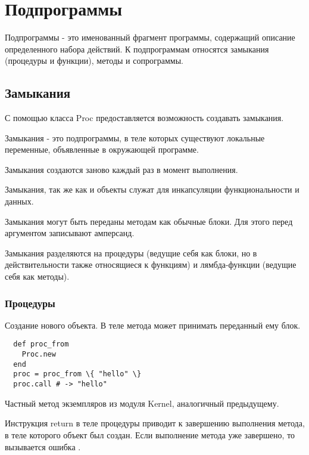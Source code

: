 \chapter{Подпрограммы}

Подпрограммы - это именованный фрагмент программы, содержащий описание определенного набора действий. К подпрограммам относятся замыкания (процедуры и функции), методы и сопрограммы.

\section{Замыкания}

С помощью класса Proc предоставляется возможность создавать замыкания. 

Замыкания - это подпрограммы, в теле которых существуют локальные переменные, объявленные в окружающей программе.

Замыкания создаются заново каждый раз в момент выполнения.

Замыкания, так же как и объекты служат для инкапсуляции функциональности и данных.

Замыкания могут быть переданы методам как обычные блоки. Для этого перед аргументом записывают амперсанд.

Замыкания разделяются на процедуры (ведущие себя как блоки, но в действительности также относящиеся к функциям) и лямбда-функции (ведущие себя как методы).

\subsection{Процедуры}

\begin{methodlist}
  Создание нового объекта. В теле метода может принимать переданный ему блок.
  \begin{verbatim}
  def proc_from
    Proc.new
  end
  proc = proc_from \{ "hello" \}
  proc.call # -> "hello"
  \end{verbatim}

  Частный метод экземпляров из модуля Kernel, аналогичный предыдущему.
\end{methodlist}

Инструкция return в теле процедуры приводит к завершению выполнения метода, в теле которого объект был создан. Если выполнение метода уже завершено, то вызывается ошибка .

